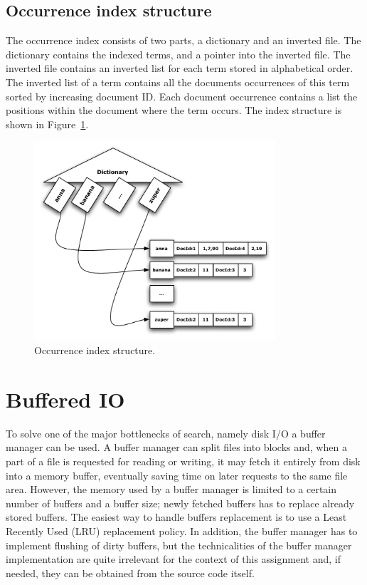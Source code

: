 \subsection{Occurrence index structure}\label{sub:occurrence_index_structure}
The occurrence index consists of two parts, a dictionary and an inverted file. The dictionary contains the indexed terms, and a pointer into the inverted file. The inverted file contains an inverted list for each term stored in alphabetical order. The inverted list of a term contains all the documents occurrences of this term sorted by increasing document ID. Each document occurrence contains a list the positions within the document where the term occurs. The index structure is shown in Figure~\ref{fig:occ_index_struct}.

\begin{figure}[h!!tb]
	\centering
	\includegraphics[width=0.8\textwidth]{include/index.pdf}
	\caption[Occurrence index structure]{Occurrence index structure.}\label{fig:occ_index_struct}
\end{figure}

\section{Buffered IO}\label{sec:buffered_io}
To solve one of the major bottlenecks of search, namely disk I/O a buffer manager can be used. A buffer manager can split files into blocks and, when a part of a file is requested for reading or writing, it may fetch it entirely from disk into a memory buffer, eventually saving time on later requests to the same file area. However, the memory used by a buffer manager is limited to a certain number of buffers and a buffer size; newly fetched buffers has to replace already stored buffers. The easiest way to handle buffers replacement is to use a Least Recently Used (LRU) replacement policy. In addition, the buffer manager has to implement flushing of dirty buffers, but the technicalities of the buffer manager implementation are quite irrelevant for the context of this assignment and, if needed, they can be obtained from the source code itself.

